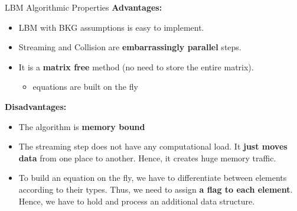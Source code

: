 \documentclass[9pt]{beamer}
\newcommand{\emphasize}[1]{\textbf{\color{red} #1 } }
\begin{document}
\begin{frame}[t]{LBM Algorithmic Properties}
\emphasize{Advantages:}
\begin{itemize}
\item LBM with BKG assumptions is easy to implement.
\item Streaming and Collision are \textbf{embarrassingly parallel} steps.
\item It is a \textbf{matrix free} method (no need to store the entire matrix).
\begin{itemize}
	\item equations are built on the fly
\end{itemize}

\end{itemize}
\emphasize{Disadvantages:}
\begin{itemize}
\item The algorithm is \textbf{memory bound}
\item The streaming step does not have any computational load. It \textbf{just moves data} from one place to another. Hence, it creates huge memory traffic.
\item To build an equation on the fly, we have to differentiate between elements according to their types. Thus, we need to assign \textbf{a flag to each element}. Hence, we have to hold and process an additional data structure.
\end{itemize}
\end{frame}
\end{document}
